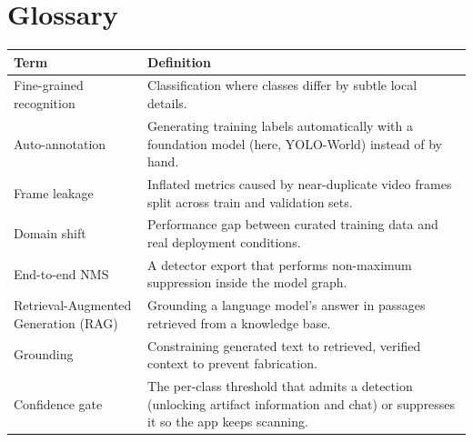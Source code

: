 \chapter*{Glossary}

\begin{center}
\begin{tabular}{@{}p{}p{}@{}}
\toprule
\textbf{Term} & \textbf{Definition}\\
\midrule
Fine-grained recognition & Classification where classes differ by subtle local details.\\
Auto-annotation & Generating training labels automatically with a foundation model (here, YOLO-World) instead of by hand.\\
Frame leakage & Inflated metrics caused by near-duplicate video frames split across train and validation sets.\\
Domain shift & Performance gap between curated training data and real deployment conditions.\\
End-to-end NMS & A detector export that performs non-maximum suppression inside the model graph.\\
Retrieval-Augmented Generation (RAG) & Grounding a language model's answer in passages retrieved from a knowledge base.\\
Grounding & Constraining generated text to retrieved, verified context to prevent fabrication.\\
Confidence gate & The per-class threshold that admits a detection (unlocking artifact information and chat) or suppresses it so the app keeps scanning.\\
\bottomrule
\end{tabular}
\end{center}
